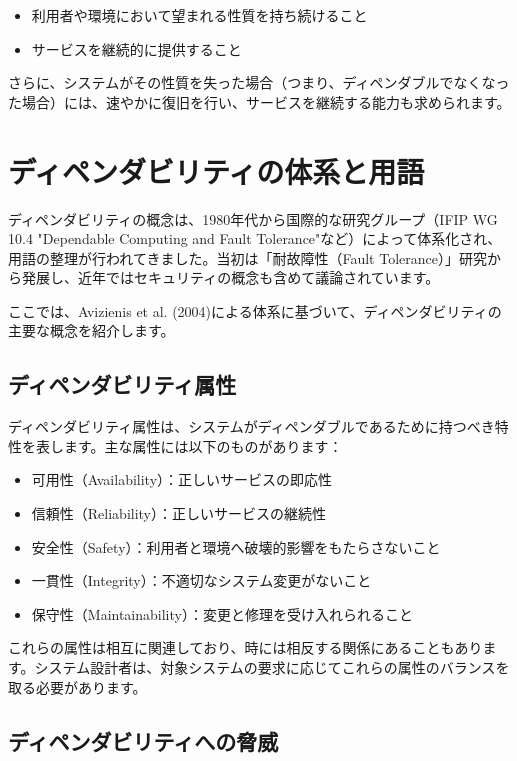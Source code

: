 \begin{itemize}
\item 利用者や環境において望まれる性質を持ち続けること
\item サービスを継続的に提供すること
\end{itemize}

さらに、システムがその性質を失った場合（つまり、ディペンダブルでなくなった場合）には、速やかに復旧を行い、サービスを継続する能力も求められます。

\section{ディペンダビリティの体系と用語}

ディペンダビリティの概念は、1980年代から国際的な研究グループ（IFIP WG 10.4 "Dependable Computing and Fault Tolerance"など）によって体系化され、用語の整理が行われてきました。当初は「耐故障性（Fault Tolerance）」研究から発展し、近年ではセキュリティの概念も含めて議論されています。

ここでは、Avizienis et al. (2004)による体系に基づいて、ディペンダビリティの主要な概念を紹介します。

\subsection{ディペンダビリティ属性}

ディペンダビリティ属性は、システムがディペンダブルであるために持つべき特性を表します。主な属性には以下のものがあります：

\begin{itemize}
\item 可用性（Availability）：正しいサービスの即応性
\item 信頼性（Reliability）：正しいサービスの継続性
\item 安全性（Safety）：利用者と環境へ破壊的影響をもたらさないこと
\item 一貫性（Integrity）：不適切なシステム変更がないこと
\item 保守性（Maintainability）：変更と修理を受け入れられること
\end{itemize}

これらの属性は相互に関連しており、時には相反する関係にあることもあります。システム設計者は、対象システムの要求に応じてこれらの属性のバランスを取る必要があります。

\subsection{ディペンダビリティへの脅威}

